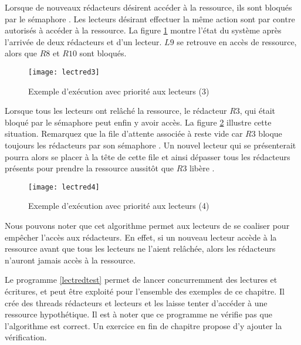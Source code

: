 Lorsque de nouveaux rédacteurs désirent accéder à la ressource, ils sont bloqués par le sémaphore . Les lecteurs désirant effectuer la même action sont par contre autorisés à accéder à la ressource. La figure \ref{fig:lectred3} montre l'état du système après l'arrivée de deux rédacteurs et d'un lecteur. $L9$ se retrouve en accès de ressource, alors que $R8$ et $R10$ sont bloqués.

\begin{figure}[!ht]
  \centering
  \texttt{[image: lectred3]}
  \caption{\label{fig:lectred3}Exemple d'exécution avec priorité aux lecteurs (3)}
\end{figure}

Lorsque tous les lecteurs ont relâché la ressource, le rédacteur $R3$, qui était bloqué par le sémaphore  peut enfin y avoir accès.
La figure \ref{fig:lectred4} illustre cette situation.
Remarquez que la file d'attente associée à  reste vide car $R3$ bloque toujours les rédacteurs par son sémaphore . Un nouvel lecteur qui se présenterait pourra alors se placer à la tête de cette file et ainsi dépasser tous les rédacteurs présents pour prendre la ressource aussitôt que $R3$ libère .

\begin{figure}[!ht]
  \centering
  \texttt{[image: lectred4]}
  \caption{\label{fig:lectred4}Exemple d'exécution avec priorité aux lecteurs (4)}
\end{figure}

Nous pouvons noter que cet algorithme permet aux lecteurs de se coaliser pour empêcher l'accès aux rédacteurs. En effet, si un nouveau lecteur accède à la ressource avant que tous les lecteurs ne l'aient relâchée, alors les rédacteurs n'auront jamais accès à la ressource.

Le programme \ref{lectredtest} permet de lancer concurremment des lectures et écritures, et peut être exploité pour l'ensemble des exemples de ce chapitre. Il crée des threads rédacteurs et lecteurs et les laisse tenter d'accéder à une ressource hypothétique. Il est à noter que ce programme ne vérifie pas que l'algorithme est correct. Un exercice en fin de chapitre propose d'y ajouter la vérification.

